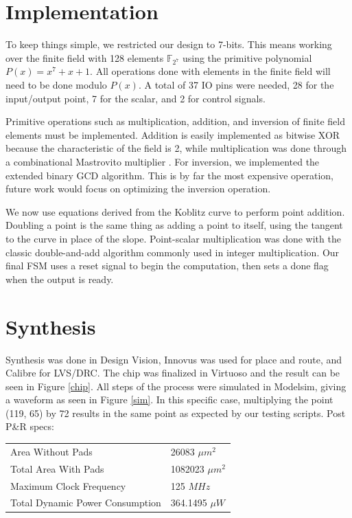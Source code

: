 \documentclass{IEEEtran}
\begin{document}
\section{Implementation}

To keep things simple, we restricted our design to 7-bits. This means working over the finite field with 128 elements $\mathbb{F}_{2^7}$ using the primitive polynomial $P(x) = x^7 + x + 1$. All operations done with elements in the finite field will need to be done modulo $P(x)$. A total of 37 IO pins were needed, 28 for the input/output point, 7 for the scalar, and 2 for control signals. 

Primitive operations such as multiplication, addition, and inversion of finite field elements must be implemented. Addition is easily implemented as bitwise XOR because the characteristic of the field is 2, while multiplication was done through a combinational Mastrovito multiplier \cite{Kallabook}. For inversion, we implemented the extended binary GCD algorithm. This is by far the most expensive operation, future work would focus on optimizing the inversion operation.

We  now use equations derived from the Koblitz curve to perform point addition. Doubling a point is the same thing as adding a point to itself, using the tangent to the curve in place of the slope. Point-scalar multiplication was done with the classic double-and-add algorithm commonly used in integer multiplication. Our final FSM uses a reset signal to begin the computation, then sets a done flag when the output is ready. 

\section{Synthesis}
Synthesis was done in Design Vision, Innovus was used for place and route, and Calibre for LVS/DRC. The chip was finalized in Virtuoso and the result can be seen in Figure \ref{chip}. All steps of the process were simulated in Modelsim, giving a waveform as seen in Figure \ref{sim}. In this specific case, multiplying the point (119, 65) by 72 results in the same point as expected by our testing scripts. Post P\&R specs:

 \begin{tabular}{ l l }
  Area Without Pads & 26083 ${\mu}m^2$ \\
  Total Area With Pads & 1082023 ${\mu}m^2$ \\
  Maximum Clock Frequency & 125 $MHz$ \\
  Total Dynamic Power Consumption & 364.1495 ${\mu}W$\\
\end{tabular}
\end{document}
